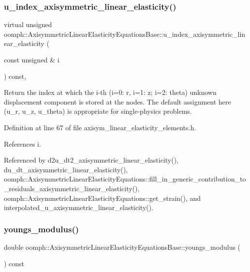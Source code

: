 \subsubsection{\texorpdfstring{u\+\_\+index\+\_\+axisymmetric\+\_\+linear\+\_\+elasticity()}{u\_index\_axisymmetric\_linear\_elasticity()}}
{\footnotesize\ttfamily virtual unsigned oomph\+::\+Axisymmetric\+Linear\+Elasticity\+Equations\+Base\+::u\+\_\+index\+\_\+axisymmetric\+\_\+linear\+\_\+elasticity (\begin{DoxyParamCaption}\item[{const unsigned \&}]{i }\end{DoxyParamCaption}) const\hspace{0.3cm}{\ttfamily [inline]}, {\ttfamily [virtual]}}



Return the index at which the i-\/th (i=0\+: r, i=1\+: z; i=2\+: theta) unknown displacement component is stored at the nodes. The default assignment here (u\+\_\+r, u\+\_\+z, u\+\_\+theta) is appropriate for single-\/physics problems. 



Definition at line 67 of file axisym\+\_\+linear\+\_\+elasticity\+\_\+elements.\+h.



References i.



Referenced by d2u\+\_\+dt2\+\_\+axisymmetric\+\_\+linear\+\_\+elasticity(), du\+\_\+dt\+\_\+axisymmetric\+\_\+linear\+\_\+elasticity(), oomph\+::\+Axisymmetric\+Linear\+Elasticity\+Equations\+::fill\+\_\+in\+\_\+generic\+\_\+contribution\+\_\+to\+\_\+residuals\+\_\+axisymmetric\+\_\+linear\+\_\+elasticity(), oomph\+::\+Axisymmetric\+Linear\+Elasticity\+Equations\+::get\+\_\+strain(), and interpolated\+\_\+u\+\_\+axisymmetric\+\_\+linear\+\_\+elasticity().

\mbox{\label{classoomph_1_1AxisymmetricLinearElasticityEquationsBase_a8e7ec15db5634c6fd8fac7a848baf19d}} 
\subsubsection{\texorpdfstring{youngs\+\_\+modulus()}{youngs\_modulus()}}
{\footnotesize\ttfamily double oomph\+::\+Axisymmetric\+Linear\+Elasticity\+Equations\+Base\+::youngs\+\_\+modulus (\begin{DoxyParamCaption}{ }\end{DoxyParamCaption}) const\hspace{0.3cm}{\ttfamily [inline]}}



